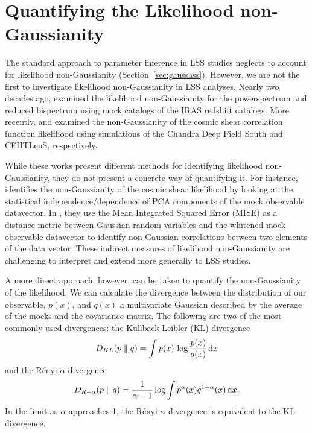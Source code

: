 \documentclass[12pt, letterpaper, preprint]{aastex}
\newcommand{\beq}{\begin{equation}}
\newcommand{\eeq}{\end{equation}}
\begin{document}
\section{Quantifying the Likelihood non-Gaussianity} \label{sec:div}
The standard approach to parameter inference in LSS studies neglects
to account for likelihood non-Gaussianity (Section~\ref{sec:gaussass}). 
However, we are not the first to investigate likelihood non-Gaussianity 
in LSS analyses. Nearly two decades ago, \cite{scoccimarro2000} examined 
the likelihood non-Gaussianity for the powerspectrum and reduced bispectrum 
using mock catalogs of the IRAS redshift catalogs. More recently, 
\cite{hartlap2009} and \cite{sellentin2017} examined the non-Gaussianity 
of the cosmic shear correlation function likelihood using simulations of 
the Chandra Deep Field South and CFHTLenS, respectively. 

While these works present different methods for identifying 
likelihood non-Gaussianity, they do not present a concrete way of 
quantifying it. For instance, \cite{hartlap2009} identifies the
non-Gaussianity of the cosmic shear likelihood by looking at the
statistical independence/dependence of PCA components of the mock 
observable datavector. In \cite{sellentin2017}, they use the Mean
Integrated Squared Error (MISE) as a distance metric between 
Gaussian random variables and the whitened mock observable 
datavector to identify non-Gaussian correlations between two elements 
of the data vector. These indirect measures of likelihood non-Gaussianity 
are challenging to interpret and extend more generally to LSS studies. 


A more direct approach, however, can be taken to quantify the 
non-Gaussianity of the likelihood. We can calculate the divergence between 
the distribution of our observable, $p(x)$, and $q(x)$ a multivariate Gaussian described 
by the average of the mocks and the covariance matrix.
The following are two of the most commonly used divergences: 
the Kullback-Leibler (KL) divergence
\beq \label{eq:kl} 
D_{KL} ( p \parallel q ) = \int p(x)\,\log \frac{p(x)}{q(x)}\,{\rm d}x
\eeq
and the R\'enyi-$\alpha$ divergence
\beq \label{eq:renyi}
D_{R-\alpha} ( p \parallel q ) = \frac{1}{\alpha -1} \log \int p^\alpha(x) q^{1 -\alpha}(x)\,{\rm d}x. 
\eeq
In the limit as $\alpha$ approaches 1, the R\'enyi-$\alpha$ divergence is
equivalent to the KL divergence.
\end{document}
